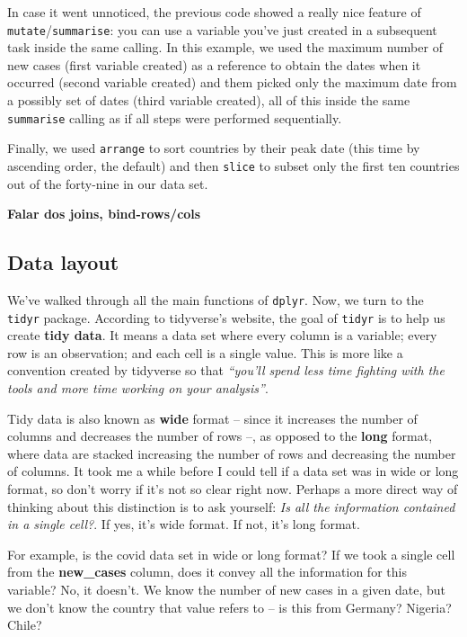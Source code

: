 \documentclass[
]{book}
\begin{document}
In case it went unnoticed, the previous code showed a really nice feature of \texttt{mutate}/\texttt{summarise}: you can use a variable you've just created in a subsequent task inside the same calling. In this example, we used the maximum number of new cases (first variable created) as a reference to obtain the dates when it occurred (second variable created) and them picked only the maximum date from a possibly set of dates (third variable created), all of this inside the same \texttt{summarise} calling as if all steps were performed sequentially.

Finally, we used \texttt{arrange} to sort countries by their peak date (this time by ascending order, the default) and then \texttt{slice} to subset only the first ten countries out of the forty-nine in our data set.

\textbf{Falar dos joins, bind-rows/cols}

\hypertarget{data-layout}{%
\subsection{Data layout}\label{data-layout}}

We've walked through all the main functions of \texttt{dplyr}. Now, we turn to the \texttt{tidyr} package. According to tidyverse's website, the goal of \texttt{tidyr} is to help us create \textbf{tidy data}. It means a data set where every column is a variable; every row is an observation; and each cell is a single value. This is more like a convention created by tidyverse so that \emph{``you'll spend less time fighting with the tools and more time working on your analysis''}.

Tidy data is also known as \textbf{wide} format -- since it increases the number of columns and decreases the number of rows --, as opposed to the \textbf{long} format, where data are stacked increasing the number of rows and decreasing the number of columns. It took me a while before I could tell if a data set was in wide or long format, so don't worry if it's not so clear right now. Perhaps a more direct way of thinking about this distinction is to ask yourself: \emph{Is all the information contained in a single cell?}. If yes, it's wide format. If not, it's long format.

For example, is the covid data set in wide or long format? If we took a single cell from the \textbf{new\_cases} column, does it convey all the information for this variable? No, it doesn't. We know the number of new cases in a given date, but we don't know the country that value refers to -- is this from Germany? Nigeria? Chile?
\end{document}
